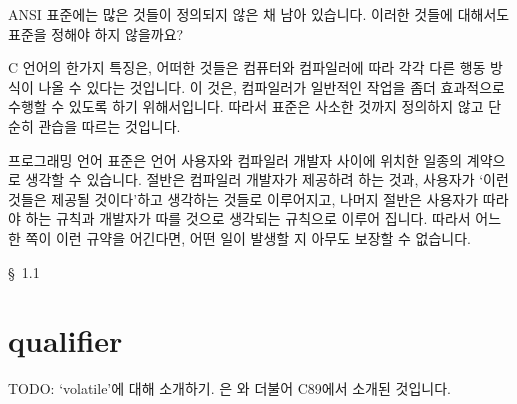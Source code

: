 \begin{faq}
	ANSI 표준에는 많은 것들이 정의되지 않은 채 남아 있습니다.
	이러한 것들에 대해서도 표준을 정해야 하지 않을까요?
	
\A	C 언어의 한가지 특징은, 어떠한 것들은 컴퓨터와 컴파일러에 따라
	각각 다른 행동 방식이 나올 수 있다는 것입니다.
	이 것은, 컴파일러가 일반적인 작업을 좀더 효과적으로 수행할 수
	있도록 하기 위해서입니다.  따라서 표준은 사소한 것까지 정의하지
	않고 단순히 관습을 따르는 것입니다.

	프로그래밍 언어 표준은 언어 사용자와 컴파일러 개발자 사이에
	위치한 일종의 계약으로 생각할 수 있습니다.
	절반은 컴파일러 개발자가 제공하려 하는 것과, 사용자가
	`이런 것들은 제공될 것이다'하고 생각하는 것들로 이루어지고,
	나머지 절반은 사용자가 따라야 하는 규칙과 개발자가 따를 것으로
	생각되는 규칙으로 이루어 집니다.
	따라서 어느 한 쪽이 이런 규약을 어긴다면, 어떤 일이 발생할 지
	아무도 보장할 수 없습니다.

\R
	\cite{rationale} \S\ 1.1
\end{faq}


\section{ qualifier}
TODO: `volatile'에 대해 소개하기.
은 와 더불어 C89에서 소개된 것입니다.

